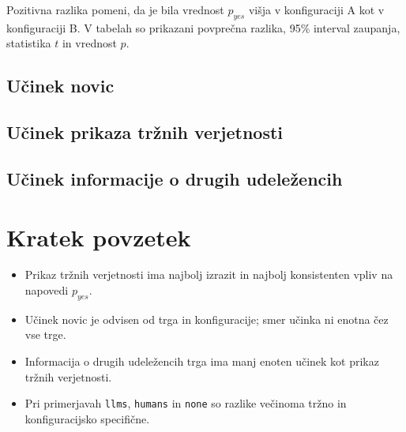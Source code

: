 \documentclass[11pt,a4paper]{article}
\begin{document}
Pozitivna razlika pomeni, da je bila vrednost $p_{yes}$ višja v konfiguraciji A kot v konfiguraciji B. V tabelah so prikazani povprečna razlika, 95\% interval zaupanja, statistika $t$ in vrednost $p$.

\subsection{Učinek novic}

\begin{landscape}

\end{landscape}

\subsection{Učinek prikaza tržnih verjetnosti}

\begin{landscape}

\end{landscape}

\subsection{Učinek informacije o drugih udeležencih}

\begin{landscape}

\end{landscape}

\section{Kratek povzetek}

\begin{itemize}
    \item Prikaz tržnih verjetnosti ima najbolj izrazit in najbolj konsistenten vpliv na napovedi $p_{yes}$.
    \item Učinek novic je odvisen od trga in konfiguracije; smer učinka ni enotna čez vse trge.
    \item Informacija o drugih udeležencih trga ima manj enoten učinek kot prikaz tržnih verjetnosti.
    \item Pri primerjavah \texttt{llms}, \texttt{humans} in \texttt{none} so razlike večinoma tržno in konfiguracijsko specifične.
\end{itemize}
\end{document}
